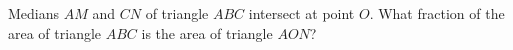 Medians $AM$ and $CN$ of triangle $ABC$ intersect at point $O$. What fraction of the area of triangle $ABC$ is the area of triangle $AON$?
